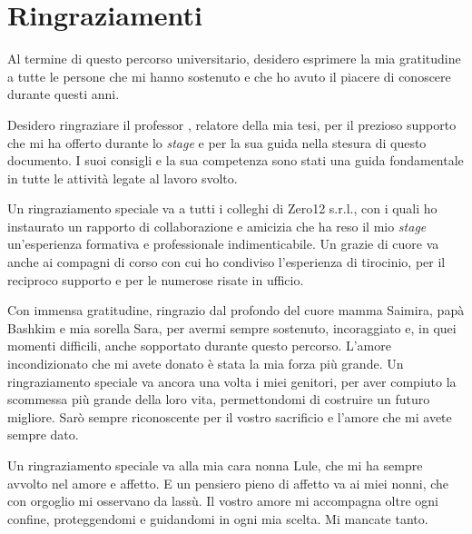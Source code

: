 \cleardoublepage
{}
{}



\begingroup
\let\clearpage\relax
\let\cleardoublepage\relax
\let\cleardoublepage\relax

\chapter*{Ringraziamenti}

Al termine di questo percorso universitario, desidero esprimere la mia gratitudine a tutte le persone che mi hanno sostenuto e che ho avuto il piacere di conoscere durante questi anni.

\vspace{10pt}

\noindent Desidero ringraziare il professor \myProf, relatore della mia tesi, per il prezioso supporto che mi ha offerto durante lo \textit{stage} e per la sua guida nella stesura di questo documento. I suoi consigli e la sua competenza sono stati una guida fondamentale in tutte le attività legate al lavoro svolto.

\vspace{10pt}

\noindent Un ringraziamento speciale va a tutti i colleghi di Zero12 s.r.l., con i quali ho instaurato un rapporto di collaborazione e amicizia che ha reso il mio \textit{stage} un'esperienza formativa e professionale indimenticabile. Un grazie di cuore va anche ai compagni di corso con cui ho condiviso l’esperienza di tirocinio, per il reciproco supporto e per le numerose risate in ufficio.

\vspace{10pt}

\noindent Con immensa gratitudine, ringrazio dal profondo del cuore mamma Saimira, papà Bashkim e mia sorella Sara, per avermi sempre sostenuto, incoraggiato e, in quei momenti difficili, anche sopportato durante questo percorso. L'amore incondizionato che mi avete donato è stata la mia forza più grande. Un ringraziamento speciale va ancora una volta i miei genitori, per aver compiuto la scommessa più grande della loro vita, permettondomi di costruire un futuro migliore. Sarò sempre riconoscente per il vostro sacrificio e l'amore che mi avete sempre dato.

\vspace{10pt}
\noindent Un ringraziamento speciale va alla mia cara nonna Lule, che mi ha sempre avvolto nel amore e affetto. E un pensiero pieno di affetto va ai miei nonni, che con orgoglio mi osservano da lassù. Il vostro amore mi accompagna oltre ogni confine, proteggendomi e guidandomi in ogni mia scelta. Mi mancate tanto.

